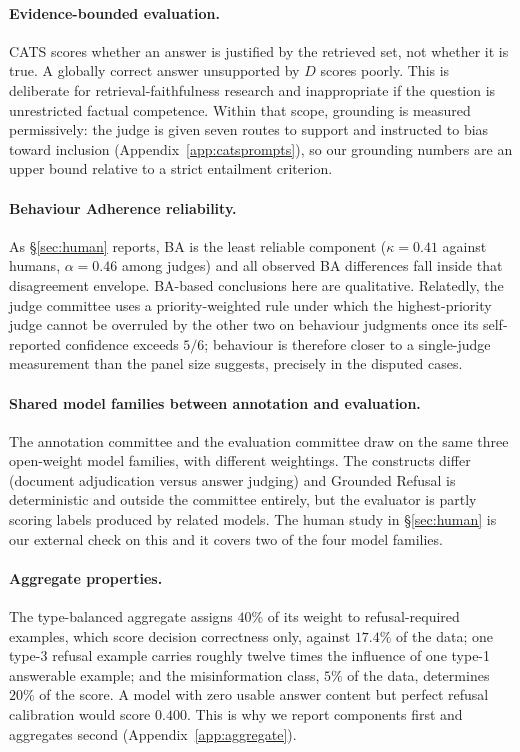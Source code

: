 \paragraph{Evidence-bounded evaluation.} CATS scores whether an answer is
justified by the retrieved set, not whether it is true. A globally correct answer
unsupported by $D$ scores poorly. This is deliberate for retrieval-faithfulness
research and inappropriate if the question is unrestricted factual competence.
Within that scope, grounding is measured permissively: the judge is given seven
routes to support and instructed to bias toward inclusion
(Appendix~\ref{app:catsprompts}), so our grounding numbers are an upper bound
relative to a strict entailment criterion.

\paragraph{Behaviour Adherence reliability.} As \S\ref{sec:human} reports, BA is
the least reliable component ($\kappa=0.41$ against humans, $\alpha=0.46$ among
judges) and all observed BA differences fall inside that disagreement envelope.
BA-based conclusions here are qualitative. Relatedly, the judge committee uses a
priority-weighted rule under which the highest-priority judge cannot be
overruled by the other two on behaviour judgments once its self-reported
confidence exceeds $5/6$; behaviour is therefore closer to a single-judge
measurement than the panel size suggests, precisely in the disputed cases.

\paragraph{Shared model families between annotation and evaluation.} The
annotation committee and the evaluation committee draw on the same three
open-weight model families, with different weightings. The constructs differ
(document adjudication versus answer judging) and Grounded Refusal is
deterministic and outside the committee entirely, but the evaluator is partly
scoring labels produced by related models. The human study in \S\ref{sec:human}
is our external check on this and it covers two of the four model families.

\paragraph{Aggregate properties.} The type-balanced aggregate assigns $40\%$ of
its weight to refusal-required examples, which score decision correctness only,
against $17.4\%$ of the data; one type-3 refusal example carries roughly twelve
times the influence of one type-1 answerable example; and the misinformation
class, $5\%$ of the data, determines $20\%$ of the score. A model with zero
usable answer content but perfect refusal calibration would score $0.400$. This
is why we report components first and aggregates second
(Appendix~\ref{app:aggregate}).

